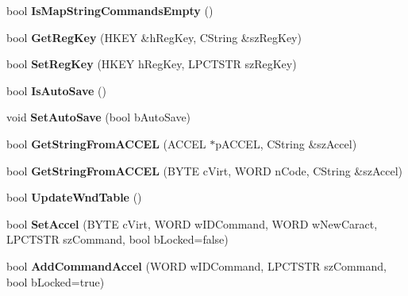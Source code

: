 \begin{DoxyCompactItemize}
bool {\bfseries Is\+Map\+String\+Commands\+Empty} ()
\item 
\mbox{\label{class_c_accelerator_manager_afcb43e85351bae0fb475dac40ba4cede}} 
bool {\bfseries Get\+Reg\+Key} (H\+K\+EY \&h\+Reg\+Key, C\+String \&sz\+Reg\+Key)
\item 
\mbox{\label{class_c_accelerator_manager_a6ea67e9b2bfbda2f0305024e0d73a5bb}} 
bool {\bfseries Set\+Reg\+Key} (H\+K\+EY h\+Reg\+Key, L\+P\+C\+T\+S\+TR sz\+Reg\+Key)
\item 
\mbox{\label{class_c_accelerator_manager_a895420283e3ce58576ded1a3f999724a}} 
bool {\bfseries Is\+Auto\+Save} ()
\item 
\mbox{\label{class_c_accelerator_manager_a84b4a9dfb4afc48430655e234ff94349}} 
void {\bfseries Set\+Auto\+Save} (bool b\+Auto\+Save)
\item 
\mbox{\label{class_c_accelerator_manager_a5e861b03f3647e8c4998c49ccd4d8928}} 
bool {\bfseries Get\+String\+From\+A\+C\+C\+EL} (A\+C\+C\+EL $\ast$p\+A\+C\+C\+EL, C\+String \&sz\+Accel)
\item 
\mbox{\label{class_c_accelerator_manager_adf91477de6b9df320930786c9755b0eb}} 
bool {\bfseries Get\+String\+From\+A\+C\+C\+EL} (B\+Y\+TE c\+Virt, W\+O\+RD n\+Code, C\+String \&sz\+Accel)
\item 
\mbox{\label{class_c_accelerator_manager_a3fa9c8e4f44acc76cc40fc7382e597d8}} 
bool {\bfseries Update\+Wnd\+Table} ()
\item 
\mbox{\label{class_c_accelerator_manager_a96957fd8ed0a15d0dbc508359824db3c}} 
bool {\bfseries Set\+Accel} (B\+Y\+TE c\+Virt, W\+O\+RD w\+I\+D\+Command, W\+O\+RD w\+New\+Caract, L\+P\+C\+T\+S\+TR sz\+Command, bool b\+Locked=false)
\item 
\mbox{\label{class_c_accelerator_manager_a05227e733c2c5d4a4d8074bf28a4f333}} 
bool {\bfseries Add\+Command\+Accel} (W\+O\+RD w\+I\+D\+Command, L\+P\+C\+T\+S\+TR sz\+Command, bool b\+Locked=true)

\end{DoxyCompactItemize}
